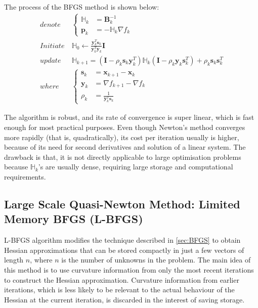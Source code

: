The process of the BFGS method is shown below:
\begin{align}
  denote   & \                       \left\{
  \begin{array}{ll}
    \mathbb{H}_k & = \textbf{B}_k^{-1}          \\
    \textbf{p}_k & = -\mathbb{H}_k \nabla f_{k}
  \end{array}
  \right.                                                                                                                                                                                                        \\
  Initiate & \ \mathbb{H}_0     \leftarrow \frac{\textbf{y}_k^T\textbf{s}_k}{\textbf{y}_k^T\textbf{y}_k}\textbf{I}                                                           \label{eq:BFGS_initiate_H_0}        \\
  update   & \ \mathbb{H}_{k+1}  = (\textbf{I} - \rho_k\textbf{s}_k\textbf{y}_k^T) \mathbb{H}_{k} (\textbf{I} - \rho_k\textbf{y}_k\textbf{s}_k^T) +\rho_k\textbf{s}_k\textbf{s}_k^T \label{eq:BFGS_update_H_k+1} \\
  where    & \                        \left\{
  \begin{array}{ll}
    \textbf{s}_k & = \textbf{x}_{k+1} - \textbf{x}_{k}                               \\
    \textbf{y}_k & = \nabla f_{k+1} - \nabla f_{k}                                   \\
    \rho_k       & = \frac{1}{\textbf{y}_k^T\textbf{s}_k} \label{eq:BFGS_calc_rho_k}
  \end{array}
  \right.
\end{align}

The algorithm is robust, and its rate of convergence is super linear, which is fast enough for most practical purposes. Even though Newton's method converges more rapidly (that is, quadratically), its cost per iteration usually is higher, because of its need for second derivatives and solution of a linear system. The drawback is that, it is not directly applicable to large optimisation problems because $\mathbb{H}_k$'s are usually dense, requiring large storage and computational requirements. \cite{Nocedal2006}



\subsection{Large Scale Quasi-Newton Method: Limited Memory BFGS (L-BFGS)}\label{sec:L-BFGS}
L-BFGS algorithm \cite{Liu1989} modifies the technique described in \cref{sec:BFGS} to obtain Hessian approximations that can be stored compactly in just a few vectors of length $n$, where $n$ is the number of unknowns in the problem. The main idea of this method is to use curvature information from only the most recent iterations to construct the Hessian approximation. Curvature information from earlier iterations, which is less likely to be relevant to the actual behaviour of the Hessian at the current iteration, is discarded in the interest of saving storage. \cite{Nocedal2006}

